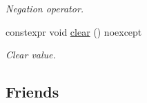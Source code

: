 \begin{DoxyCompactItemize}
\begin{DoxyCompactList}\small\item\em Negation operator. \end{DoxyCompactList}\item 
constexpr void \hyperlink{class_mdt_1_1_numeric_1_1_physics_type_a7f2eda637785fd676a25a62972ae601c}{clear} () noexcept\hypertarget{class_mdt_1_1_numeric_1_1_physics_type_a7f2eda637785fd676a25a62972ae601c}{}\label{class_mdt_1_1_numeric_1_1_physics_type_a7f2eda637785fd676a25a62972ae601c}

\begin{DoxyCompactList}\small\item\em Clear value. \end{DoxyCompactList}\end{DoxyCompactItemize}
\subsection*{Friends}
